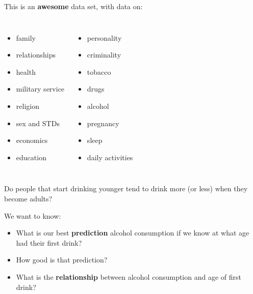 \documentclass{beamer}\usepackage[]{graphicx}\usepackage[]{color}
\begin{document}
\begin{darkframes}
    \begin{frame}
      This is an \textbf{awesome} data set, with data on:
      \begin{columns}[onlytextwidth]
          \begin{itemize}
            \item family
            \item relationships
            \item health
            \item military service
            \item religion
            \item sex and STDs
            \item economics
            \item education
          \end{itemize}
          \begin{itemize}
            \item personality
            \item criminality
            \item tobacco
            \item drugs
            \item alcohol
            \item pregnancy
            \item sleep
            \item daily activities
          \end{itemize}
      \end{columns}
    \end{frame}

    \begin{frame}
      \begin{center}
        Do people that start drinking younger tend to drink more (or less) when they become adults?
      \end{center}
      \bigskip\pause
      We want to know: 
      \begin{itemize}[<+->]
        \item What is our best \textbf{prediction} alcohol consumption if we know at what age had their first drink?
        \item How good is that prediction?
        \item What is the \textbf{relationship} between alcohol consumption and age of first drink?
      \end{itemize}
    \end{frame}


\end{darkframes}
\end{document}
